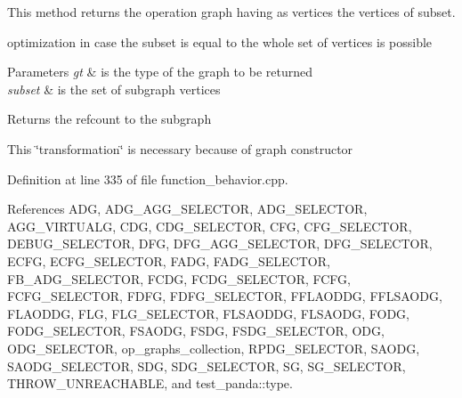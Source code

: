 This method returns the operation graph having as vertices the vertices of subset. 

optimization in case the subset is equal to the whole set of vertices is possible


\begin{DoxyParams}{Parameters}
{\em gt} & is the type of the graph to be returned \\
\hline
{\em subset} & is the set of subgraph vertices \\
\hline
\end{DoxyParams}
\begin{DoxyReturn}{Returns}
the refcount to the subgraph 
\end{DoxyReturn}
This \char`\"{}transformation\char`\"{} is necessary because of graph constructor 

Definition at line 335 of file function\+\_\+behavior.\+cpp.



References A\+DG, A\+D\+G\+\_\+\+A\+G\+G\+\_\+\+S\+E\+L\+E\+C\+T\+OR, A\+D\+G\+\_\+\+S\+E\+L\+E\+C\+T\+OR, A\+G\+G\+\_\+\+V\+I\+R\+T\+U\+A\+LG, C\+DG, C\+D\+G\+\_\+\+S\+E\+L\+E\+C\+T\+OR, C\+FG, C\+F\+G\+\_\+\+S\+E\+L\+E\+C\+T\+OR, D\+E\+B\+U\+G\+\_\+\+S\+E\+L\+E\+C\+T\+OR, D\+FG, D\+F\+G\+\_\+\+A\+G\+G\+\_\+\+S\+E\+L\+E\+C\+T\+OR, D\+F\+G\+\_\+\+S\+E\+L\+E\+C\+T\+OR, E\+C\+FG, E\+C\+F\+G\+\_\+\+S\+E\+L\+E\+C\+T\+OR, F\+A\+DG, F\+A\+D\+G\+\_\+\+S\+E\+L\+E\+C\+T\+OR, F\+B\+\_\+\+A\+D\+G\+\_\+\+S\+E\+L\+E\+C\+T\+OR, F\+C\+DG, F\+C\+D\+G\+\_\+\+S\+E\+L\+E\+C\+T\+OR, F\+C\+FG, F\+C\+F\+G\+\_\+\+S\+E\+L\+E\+C\+T\+OR, F\+D\+FG, F\+D\+F\+G\+\_\+\+S\+E\+L\+E\+C\+T\+OR, F\+F\+L\+A\+O\+D\+DG, F\+F\+L\+S\+A\+O\+DG, F\+L\+A\+O\+D\+DG, F\+LG, F\+L\+G\+\_\+\+S\+E\+L\+E\+C\+T\+OR, F\+L\+S\+A\+O\+D\+DG, F\+L\+S\+A\+O\+DG, F\+O\+DG, F\+O\+D\+G\+\_\+\+S\+E\+L\+E\+C\+T\+OR, F\+S\+A\+O\+DG, F\+S\+DG, F\+S\+D\+G\+\_\+\+S\+E\+L\+E\+C\+T\+OR, O\+DG, O\+D\+G\+\_\+\+S\+E\+L\+E\+C\+T\+OR, op\+\_\+graphs\+\_\+collection, R\+P\+D\+G\+\_\+\+S\+E\+L\+E\+C\+T\+OR, S\+A\+O\+DG, S\+A\+O\+D\+G\+\_\+\+S\+E\+L\+E\+C\+T\+OR, S\+DG, S\+D\+G\+\_\+\+S\+E\+L\+E\+C\+T\+OR, SG, S\+G\+\_\+\+S\+E\+L\+E\+C\+T\+OR, T\+H\+R\+O\+W\+\_\+\+U\+N\+R\+E\+A\+C\+H\+A\+B\+LE, and test\+\_\+panda\+::type.

\mbox{\label{classFunctionBehavior_af24a99568892a6b7d7659302e4f7b03f}} 

